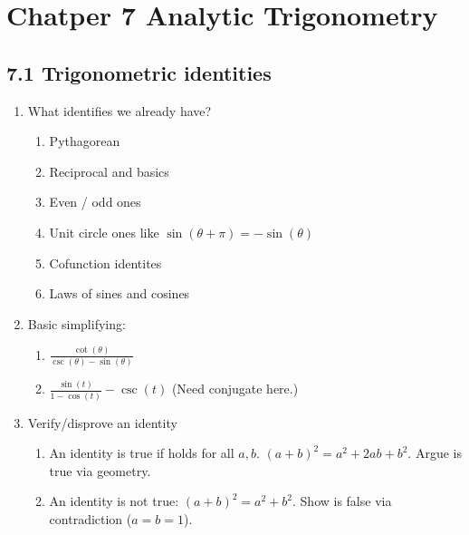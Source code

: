 \documentclass{article}
\newcommand{\ds}{\displaystyle}
\begin{document}
\section{Chatper 7 Analytic Trigonometry}

\subsection{7.1 Trigonometric identities}
\begin{enumerate}

\item What identifies we already have?
\begin{enumerate}
\item Pythagorean
\item Reciprocal and basics
\item Even / odd ones
\item Unit circle ones like $\sin(\theta +\pi) =  -\sin(\theta)$
\item Cofunction identites
\item Laws of sines and cosines
\end{enumerate}

\item Basic simplifying: 
\begin{enumerate}
\item $\ds \frac{\cot(\theta)}{\csc(\theta)-\sin(\theta)}$
\item $\ds \frac{\sin(t)}{1-\cos(t)} - \csc(t)$ (Need conjugate here.)
\end{enumerate}

\item Verify/disprove an identity
\begin{enumerate}
\item An identity is true if holds for all $a,b$. $(a+b)^2=a^2+2ab+b^2$. Argue is true via geometry.
\item An identity is not true: $(a+b)^2 = a^2+b^2$. Show is false via contradiction ($a=b=1$).
\end{enumerate}


\end{enumerate}
\end{document}
